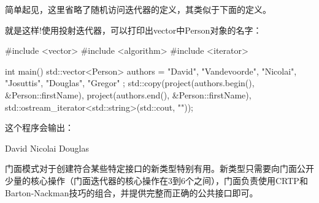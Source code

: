 简单起见，这里省略了随机访问迭代器的定义，其类似于下面的定义。

就是这样!使用投射迭代器，可以打印出vector中Person对象的名字：

\begin{cpp}
#include <vector>
#include <algorithm>
#include <iterator>

int main() {
	std::vector<Person> authors = { {"David", "Vandevoorde"},
		{"Nicolai", "Josuttis"},
		{"Douglas", "Gregor"} };
	std::copy(project(authors.begin(), &Person::firstName),
	project(authors.end(), &Person::firstName),
	std::ostream_iterator<std::string>(std::cout, "\n"));
}
\end{cpp}

这个程序会输出：

\begin{shell}
David
Nicolai
Douglas
\end{shell}

门面模式对于创建符合某些特定接口的新类型特别有用。新类型只需要向门面公开少量的核心操作（门面迭代器的核心操作在3到6个之间），门面负责使用CRTP和Barton-Nackman技巧的组合，并提供完整而正确的公共接口即可。












